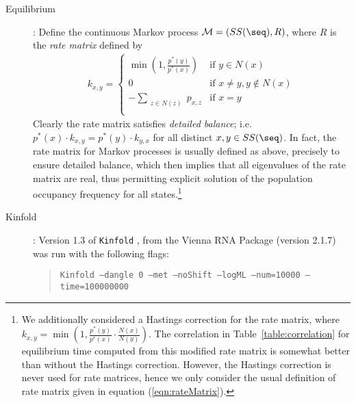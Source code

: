 \begin{description}
\item[Equilibrium]: Define the continuous Markov process
$\mathcal{M}=(SS(\seq),R)$, where $R$ is the {\em rate matrix} defined
by
\begin{eqnarray}
\label{eqn:rateMatrix} k_{x,y} = \left\{
\begin{array}{ll}

\min(1, \frac{p^*(y)}{p^*(x)} ) &\mbox{if $y \in N(x)$}\\
0 &\mbox{if $x \ne y, y \not\in N(x)$}\\
- \sum_{\substack{z \in N(z)}} p_{x,z} &\mbox{if $x=y$}\\
\end{array}
\right.
\end{eqnarray}
Clearly the rate matrix satisfies {\em detailed balance}; i.e. $p^*(x)
\cdot k_{x,y} = p^*(y) \cdot k_{y,x}$ for all distinct $x,y \in
SS(\seq)$. In fact, the rate matrix for Markov processes is usually
defined as above, precisely to ensure detailed balance, which then
implies that all eigenvalues of the rate matrix are real, thus
permitting explicit solution of the population occupancy frequency for
all states.\footnote{We additionally considered a Hastings correction
for the rate matrix, where $k_{x,y} = \min(1, \frac{p^*(y)}{p^*(x)}
\cdot \frac{N(x)}{N(y)})$. The correlation in
Table~\ref{table:correlation} for equilibrium time computed from this
modified rate matrix is somewhat better than without the Hastings
correction. However, the Hastings correction is never used for rate
matrices, hence we only consider the usual definition of rate matrix
given in equation (\ref{eqn:rateMatrix}).}

\item[Kinfold]: Version 1.3 of {\tt Kinfold} \cite{Flamm:00a}, from
the Vienna RNA Package (version 2.1.7) was run with the following
flags:
\begin{quote}
{\tt Kinfold --dangle 0 --met --noShift --logML --num=10000
--time=100000000}


\end{quote}
\end{description}
